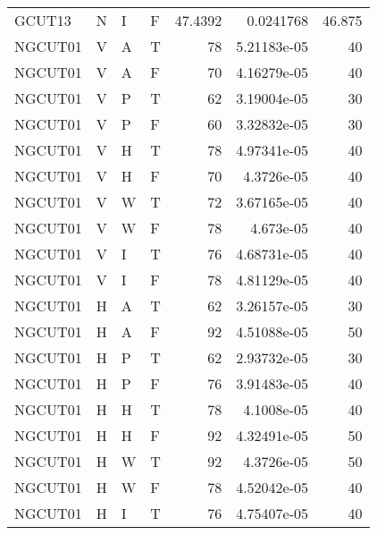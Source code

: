 \begin{longtable}{llllrrr}
    GCUT13   & N         & I         & F          & 47.4392    & 0.0241768   & 46.875   \\
    NGCUT01  & V         & A         & T          & 78         & 5.21183e-05 & 40       \\
    NGCUT01  & V         & A         & F          & 70         & 4.16279e-05 & 40       \\
    NGCUT01  & V         & P         & T          & 62         & 3.19004e-05 & 30       \\
    NGCUT01  & V         & P         & F          & 60         & 3.32832e-05 & 30       \\
    NGCUT01  & V         & H         & T          & 78         & 4.97341e-05 & 40       \\
    NGCUT01  & V         & H         & F          & 70         & 4.3726e-05  & 40       \\
    NGCUT01  & V         & W         & T          & 72         & 3.67165e-05 & 40       \\
    NGCUT01  & V         & W         & F          & 78         & 4.673e-05   & 40       \\
    NGCUT01  & V         & I         & T          & 76         & 4.68731e-05 & 40       \\
    NGCUT01  & V         & I         & F          & 78         & 4.81129e-05 & 40       \\
    NGCUT01  & H         & A         & T          & 62         & 3.26157e-05 & 30       \\
    NGCUT01  & H         & A         & F          & 92         & 4.51088e-05 & 50       \\
    NGCUT01  & H         & P         & T          & 62         & 2.93732e-05 & 30       \\
    NGCUT01  & H         & P         & F          & 76         & 3.91483e-05 & 40       \\
    NGCUT01  & H         & H         & T          & 78         & 4.1008e-05  & 40       \\
    NGCUT01  & H         & H         & F          & 92         & 4.32491e-05 & 50       \\
    NGCUT01  & H         & W         & T          & 92         & 4.3726e-05  & 50       \\
    NGCUT01  & H         & W         & F          & 78         & 4.52042e-05 & 40       \\
    NGCUT01  & H         & I         & T          & 76         & 4.75407e-05 & 40       \\

\end{longtable}
